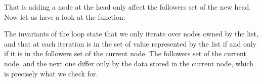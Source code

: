 
\noindent
That is adding a node at the head only affect the followers set of the new head.
Now let us have a look at the  function:


\noindent
The invariants of the  loop state that we only iterate over
nodes owned by the list, and that at each iteration  is in the
set of value represented by the list if and only if it is in the followers
set of the current node.
The followers set of the current node, and the next one differ only by
the data stored in the current node, which is precisely what we check for.

%


